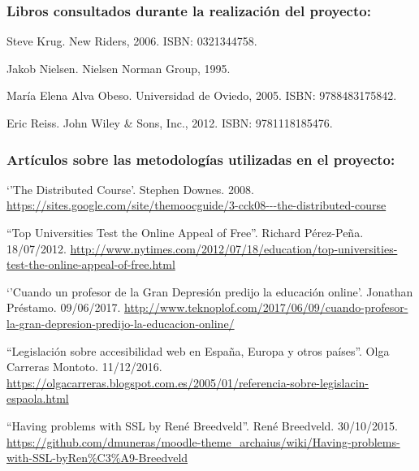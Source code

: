 
\subsubsection*{Libros consultados durante la realización del proyecto:}



Steve Krug.
\newblock New Riders, 2006.
\newblock ISBN: 0321344758.

Jakob Nielsen.
\newblock Nielsen Norman Group, 1995.

María Elena Alva Obeso.
\newblock Universidad de Oviedo, 2005.
\newblock ISBN: 9788483175842.

Eric Reiss.
\newblock John Wiley \& Sons, Inc., 2012.
\newblock ISBN: 9781118185476.


\subsubsection*{Artículos sobre las metodologías utilizadas en el proyecto:}

 `'The Distributed Course'. Stephen Downes. 2008. \url{https://sites.google.com/site/themoocguide/3-cck08---the-distributed-course}

 ``Top Universities Test the Online Appeal of Free''. Richard Pérez-Peña. 18/07/2012. \url{http://www.nytimes.com/2012/07/18/education/top-universities-test-the-online-appeal-of-free.html}

 `'Cuando un profesor de la Gran Depresión predijo la educación online'. Jonathan Préstamo. 09/06/2017. \url{http://www.teknoplof.com/2017/06/09/cuando-profesor-la-gran-depresion-predijo-la-educacion-online/}

 ``Legislación sobre accesibilidad web en España, Europa y otros países''. Olga Carreras Montoto. 11/12/2016. \url{https://olgacarreras.blogspot.com.es/2005/01/referencia-sobre-legislacin-espaola.html}

 ``Having problems with SSL by René Breedveld''. René Breedveld. 30/10/2015. \url{https://github.com/dmuneras/moodle-theme_archaius/wiki/Having-problems-with-SSL-byRen\%C3\%A9-Breedveld}

